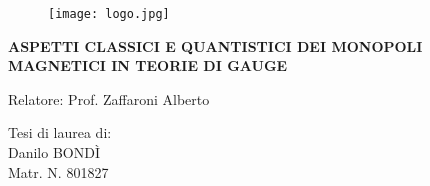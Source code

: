 \begin{titlepage}


\vspace{0.5cm}

\begin{figure}[h]
\centering
\texttt{[image: logo.jpg]}
\end{figure}

\vspace{2cm}

\centering\huge\textbf{ASPETTI CLASSICI E QUANTISTICI DEI MONOPOLI MAGNETICI IN TEORIE DI GAUGE}

\vspace{2cm}

\Large
\raggedright Relatore: Prof. Zaffaroni Alberto\par
\begin{table}[h]
	Tesi di laurea di: \\
	Danilo BONDÌ \\
	Matr. N. 801827\\
\end{table}

\vspace{1cm}

\vfill{}

\end{titlepage}





\tableofcontents

